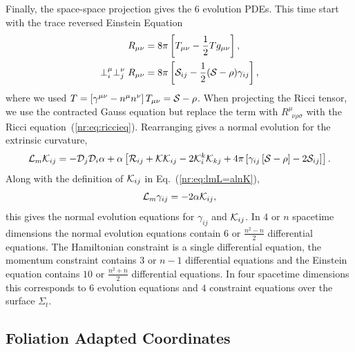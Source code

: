 Finally, the space-space projection gives the 6 evolution PDEs. This time start with the trace reversed Einstein Equation
\begin{align} R_{\mu\nu} &= 8 \pi \left[T_{\mu\nu} - \frac{1}{2}Tg_{\mu\nu}\right],\\
\perp^\mu_i\perp^\nu_jR_{\mu\nu} &= 8 \pi \left[\S_{ij} - \frac{1}{2}(\S-\rho)\gamma_{ij}\right],
\end{align}
where we used $T = \left[ \gamma^{\mu\nu} - n^\mu n^\nu\right]T_{\mu\nu} = \S-\rho$. When projecting the Ricci tensor, we use the contracted Gauss equation but replace the term with $R^\mu_{\,\,\,\nu\rho\sigma}$ with the Ricci equation~(\ref{nr:eq:riccieq}). Rearranging gives a normal evolution for the extrinsic curvature,
\begin{equation} \L_m \K_{ij} = -\D_j\D_i \alpha + \alpha \left[ \R_{ij} + \K\K_{ij} - 2\K^k_i\K_{kj} + 4\pi \left[ \gamma_{ij}\left[ \S-\rho\right]-2\S_{ij}\right]\right].\end{equation}
Along with the definition of $\K_{ij}$ in Eq.~(\ref{nr:eq:lmL=alnK}), 
\begin{equation} \label{nr:eq:Lmgamma}
\L_m \gamma_{ij} = -2\alpha \K_{ij},
\end{equation}
this gives the normal evolution equations for $\gamma_{ij}$ and $\K_{ij}$. In $4$ or $n$ spacetime dimensions the normal evolution equations contain $6$ or $\frac{n^2-n}{2}$ differential equations. The Hamiltonian constraint is a single differential equation, the momentum constraint contains $3$ or $n-1$ differential equations and the Einstein equation contains $10$ or $\frac{n^2+n}{2}$ differential equations. In four spacetime dimensions this corresponds to $6$ evolution equations and $4$ constraint equations over the surface $\Sigma_t$.

\subsection{Foliation Adapted Coordinates}

